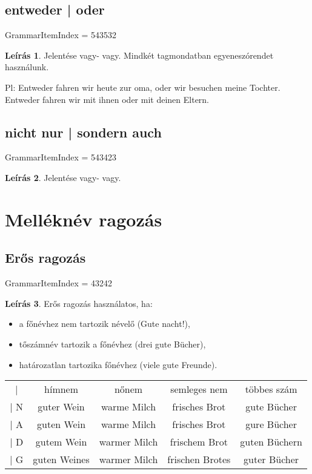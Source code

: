 \documentclass{article}
\theoremstyle{definition}
\newtheorem*{desc}{Leírás}
\begin{document}
\subsection{entweder | oder}

GrammarItemIndex = 543532

\begin{desc}
Jelentése vagy- vagy. Mindkét tagmondatban egyeneszórendet használunk.

Pl: Entweder fahren wir heute zur oma, oder wir besuchen meine Tochter.
Entweder fahren wir mit ihnen oder mit deinen Eltern.
\end{desc}

\subsection{nicht nur | sondern auch}

GrammarItemIndex = 543423

\begin{desc}
Jelentése vagy- vagy.
\end{desc}

\section{Melléknév ragozás}

\subsection{Erős ragozás}

GrammarItemIndex = 43242

\begin{desc}
Erős ragozás használatos, ha:

\begin{itemize}
	\item a főnévhez nem tartozik névelő (Gute nacht!),
	\item tőszámnév tartozik a főnévhez (drei gute Bücher),
	\item határozatlan tartozika főnévhez (viele gute Freunde).
\end{itemize}

\begin{tabular}{ccccc}
 |  & hímnem & nőnem & semleges nem & többes szám\\
 | N & guter Wein & warme Milch & frisches Brot & gute Bücher\\
 | A & guten Wein & warme Milch & frisches Brot & gure Bücher\\
 | D & gutem Wein & warmer Milch & frischem Brot & guten Büchern\\
 | G & guten Weines & warmer Milch & frischen Brotes & guter Bücher\\
\end{tabular}
\end{desc}
\end{document}

